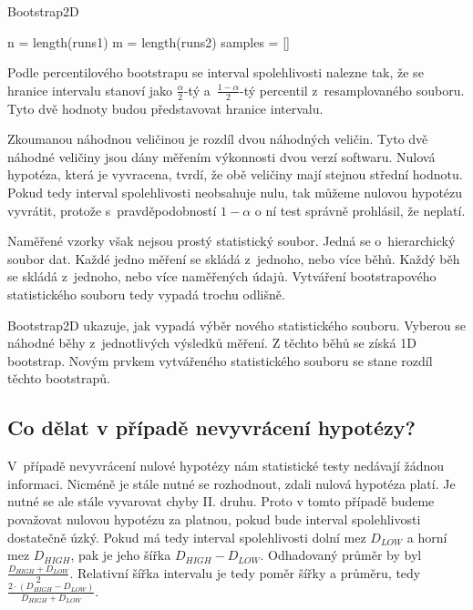 \begin{algorithm}[!ht]
    \caption{Bootstrap2D}
    
    n = length(runs1)\;
    m = length(runs2)\;
    samples = []\;
    
    
    \;
\end{algorithm}

Podle percentilového bootstrapu se interval spolehlivosti nalezne tak, že se hranice intervalu stanoví jako $\frac{\alpha}{2}$-tý
a~$\frac{1-\alpha}{2}$-tý percentil z~resamplovaného souboru. Tyto dvě hodnoty budou představovat hranice intervalu.

Zkoumanou náhodnou veličinou je rozdíl dvou náhodných veličin. Tyto dvě náhodné veličiny jsou dány měřením
výkonnosti dvou verzí softwaru. Nulová hypotéza, která je vyvracena, tvrdí, že obě veličiny mají stejnou střední hodnotu.
Pokud tedy interval spolehlivosti neobsahuje nulu, tak můžeme nulovou hypotézu vyvrátit, protože s~pravděpodobností
$1-\alpha$ o ní test správně prohlásil, že neplatí.

Naměřené vzorky však nejsou prostý statistický soubor. Jedná se o~hierarchický soubor dat.
Každé jedno měření se skládá z~jednoho, nebo více běhů. Každý běh se skládá z~jednoho, nebo více naměřených údajů.
Vytváření bootstrapového statistického souboru tedy vypadá trochu odlišně.

Bootstrap2D ukazuje, jak vypadá výběr nového statistického souboru. Vyberou
se náhodné běhy z~jednotlivých výsledků měření. Z těchto běhů se získá 1D bootstrap.
Novým prvkem vytvářeného statistického souboru se stane rozdíl těchto bootstrapů.

\subsection{Co dělat v případě nevyvrácení hypotézy?}

V~případě nevyvrácení nulové hypotézy nám statistické testy nedávají žádnou informaci.
Nicméně je stále nutné se rozhodnout, zdali nulová hypotéza platí. Je nutné se ale stále
vyvarovat chyby II. druhu. Proto v tomto případě budeme považovat nulovou hypotézu za platnou,
pokud bude interval spolehlivosti dostatečně úzký. Pokud má tedy interval spolehlivosti
dolní mez $D_{LOW}$ a horní mez $D_{HIGH}$, pak je jeho šířka $D_{HIGH}-D_{LOW}$. Odhadovaný průměr by byl $\frac{D_{HIGH}+D_{LOW}}{2}$.
Relativní šířka intervalu je tedy poměr šířky a průměru, tedy $\frac{2\cdot(D_{HIGH}-D_{LOW})}{D_{HIGH}+D_{LOW}}$.

